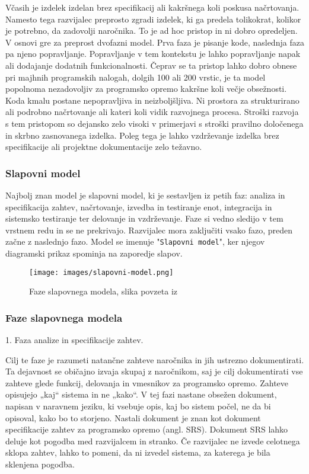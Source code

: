 \documentclass[a4paper,12pt,openright]{book}
\begin{document}
Včasih je izdelek izdelan brez specifikacij ali kakršnega koli poskusa načrtovanja. Namesto tega razvijalec preprosto zgradi izdelek, ki ga predela tolikokrat, kolikor je potrebno, da zadovolji naročnika.
To je ad hoc pristop in ni dobro opredeljen. V osnovi gre za preprost dvofazni model. Prva faza je pisanje kode, naslednja faza pa njeno popravljanje. Popravljanje v tem kontekstu je lahko popravljanje napak ali dodajanje dodatnih funkcionalnosti.
Čeprav se ta pristop lahko dobro obnese pri majhnih programskih nalogah, dolgih 100 ali 200 vrstic, je ta model popolnoma nezadovoljiv za programsko opremo kakršne koli večje obsežnosti. Koda kmalu postane nepopravljiva in neizboljšljiva. Ni prostora za strukturirano ali podrobno načrtovanje ali kateri koli vidik razvojnega procesa. Stroški razvoja s tem pristopom so dejansko zelo visoki v primerjavi s stroški pravilno določenega in skrbno zasnovanega izdelka. Poleg tega je lahko vzdrževanje izdelka brez specifikacije ali projektne dokumentacije zelo težavno. \cite{schach1996classical}
\subsubsection{Slapovni model}
Najbolj znan model je slapovni model, ki je sestavljen iz petih faz: analiza in specifikacija zahtev, načrtovanje, izvedba in testiranje enot, integracija in sistemsko testiranje ter delovanje in vzdrževanje. 
Faze si vedno sledijo v tem vrstnem redu in se ne prekrivajo. Razvijalec mora zaključiti vsako fazo, preden začne z naslednjo fazo. Model se imenuje "\texttt{Slapovni model}", ker njegov diagramski prikaz spominja na zaporedje slapov.

\begin{figure}[H]
    \centering
    \texttt{[image: images/slapovni-model.png]}
    \caption{Faze slapovnega modela, slika povzeta iz \cite{mercun2012}}
    \label{fig:enter-label}
\end{figure}

\subsubsection{Faze slapovnega modela}

1. Faza analize in specifikacije zahtev.

Cilj te faze je razumeti natančne zahteve naročnika in jih ustrezno dokumentirati. Ta dejavnost se običajno izvaja skupaj z naročnikom, saj je cilj dokumentirati vse zahteve glede funkcij, delovanja in vmesnikov za programsko opremo. Zahteve opisujejo „kaj“ sistema in ne „kako“. V tej fazi nastane obsežen dokument, napisan v naravnem jeziku, ki vsebuje opis, kaj bo sistem počel, ne da bi opisoval, kako bo to storjeno. Nastali dokument je znan kot dokument specifikacije zahtev za programsko opremo (angl. SRS). Dokument SRS lahko deluje kot pogodba med razvijalcem in stranko. Če razvijalec ne izvede celotnega sklopa zahtev, lahko to pomeni, da ni izvedel sistema, za katerega je bila sklenjena pogodba.
\end{document}
